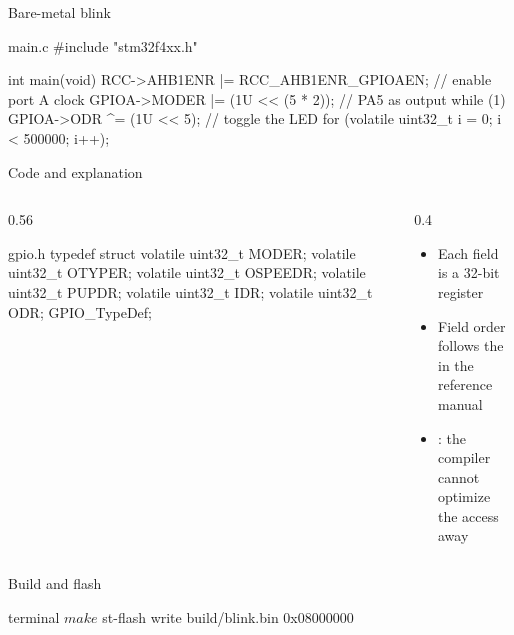 \documentclass{slemanslides}
\begin{document}



\begin{frame}[fragile]{Bare-metal blink}
\begin{code}{main.c}
#include "stm32f4xx.h"

int main(void)
{
    RCC->AHB1ENR |= RCC_AHB1ENR_GPIOAEN;    // enable port A clock
    GPIOA->MODER |= (1U << (5 * 2));        // PA5 as output
    while (1) {
        GPIOA->ODR ^= (1U << 5);            // toggle the LED
        for (volatile uint32_t i = 0; i < 500000; i++);
    }
}
\end{code}
\end{frame}



\begin{frame}[fragile]{Code and explanation}
  \begin{columns}[t]
    \begin{column}{0.56\textwidth}
\begin{code}{gpio.h}
typedef struct {
    volatile uint32_t MODER;
    volatile uint32_t OTYPER;
    volatile uint32_t OSPEEDR;
    volatile uint32_t PUPDR;
    volatile uint32_t IDR;
    volatile uint32_t ODR;
} GPIO_TypeDef;
\end{code}
    \end{column}
    \begin{column}{0.4\textwidth}
      \begin{itemize}
        \item Each field is a 32-bit register
        \item Field order follows the  in the reference
          manual
        \item {}: the compiler cannot optimize the access away
      \end{itemize}
    \end{column}
  \end{columns}
\end{frame}




\begin{frame}[fragile]{Build and flash}
\begin{code}[language=bash,numbers=none]{terminal}
$ make
$ st-flash write build/blink.bin 0x08000000
\end{code}

\end{frame}
\end{document}
